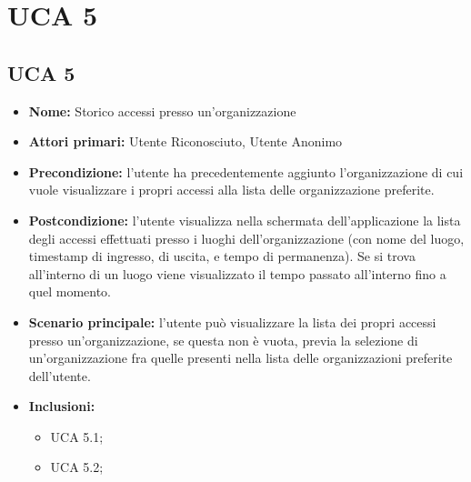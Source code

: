 \section{UCA 5}
\subsection{UCA 5}
\begin{itemize}
    \item \textbf{Nome:} Storico accessi presso un'organizzazione
    \item \textbf{Attori primari:} Utente Riconosciuto, Utente Anonimo
    \item \textbf{Precondizione:} l’utente ha precedentemente aggiunto l’organizzazione di cui vuole visualizzare i propri accessi alla lista delle organizzazione preferite.
    \item \textbf{Postcondizione:} l’utente visualizza nella schermata dell’applicazione la lista degli accessi effettuati presso i luoghi dell’organizzazione (con nome del luogo, timestamp di ingresso, di uscita, e tempo di permanenza).
    Se si trova all'interno di un luogo viene visualizzato il tempo passato all'interno fino a quel momento.
    \item \textbf{Scenario principale:} l'utente può visualizzare la lista dei propri accessi presso un'organizzazione, se questa non è vuota, previa la selezione di un'organizzazione fra quelle presenti nella lista delle organizzazioni preferite dell'utente.
    \item \textbf{Inclusioni:}
    \begin{itemize}
        \item UCA 5.1;
        \item UCA 5.2;
    \end{itemize}
\end{itemize}

